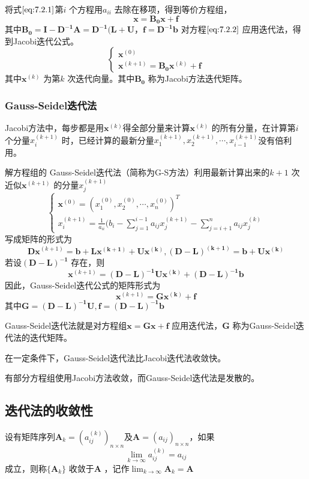 \documentclass[a4paper]{article}
\begin{document}
将式$\ref{eq:7.2.1}$第$i$ 个方程用$a_{ii}$ 去除在移项，得到等价方程组，
\[
\mathbf{x = B_0 x + f} \tag{7.2.2} \label{eq:7.2.2} 
\] 
其中$\mathbf{B_0 = I - D^{-1}A = D^{-1}(L + U}，\mathbf{f = D^{-1} b}$
对方程$\ref{eq:7.2.2}$ 应用迭代法，得到Jacobi迭代公式。
\[
\tag{7.2.3} \label{eq:7.2.3} 
\begin{cases}
	\mathbf{x}^{(0)} \\
	\mathbf{x}^{(k+1)} = \mathbf{B_0} \mathbf{x}^{(k)} + \mathbf{f}
\end{cases} 
\] 
其中$\mathbf{x}^{(k)}$ 为第$k$ 次迭代向量。其中$\mathbf{B_0}$ 称为Jacobi方法迭代矩阵。

\subsubsection{Gauss-Seidel迭代法}
Jacobi方法中，每步都是用$\mathbf{x}^{(k)}$得全部分量来计算$\mathbf{x}^{(k)}$ 的所有分量，在计算第$i$ 个分量$x_i^{(k+1)}$ 时，已经计算的最新分量$x_1^{(k+1)}, x_2^{(k+1)}, \cdots, x_{i-1}^{(k+1)}$没有倍利用。

解方程组的 Gauss-Seidel迭代法（简称为G-S方法）利用最新计算出来的$k+1$ 次近似$\mathbf{x}^{(k+1)}$ 的分量$x_j^{(k+1)}$ 
\[
\tag{7.2.3} \label{eq:7.2.3} 
\begin{cases}
	\mathbf{x}^{(0)} = (x_1^{(0)}, x_2^{(0)},\cdots, x_{n}^{(0)})^{T} \\
	x_{i}^{(k+1)} = \frac{1}{a_{ii}} (b_i - \sum_{j=1}^{i-1} a_{ij} x_j^{(k+1)} - \sum_{j=i+1}^{n} a_{ij} x_j^{(k)}
\end{cases} 
\] 
写成矩阵的形式为
\[
\mathbf{Dx}^{(k+1)} = \mathbf{b + Lx^{(k+1)} + Ux^{(k)}}, \mathbf{(D-L)^{(k+1)} = b + Ux^{(k)}}
\] 
若设$\mathbf{(D-L)^{-1}}$ 存在，则
\[
\mathbf{x}^{(k+1)} = \mathbf{(D-L)^{-1}Ux^{(k)} + (D-L)^{-1}b}
\] 
因此，Gauss-Seidel迭代公式的矩阵形式为
\[
\mathbf{x}^{(k+1)} = \mathbf{Gx^{(k)} + f} \tag{7.2.4} \label{eq:7.2.4} 
\] 
其中$\mathbf{G = (D - L)^{-1}U}, \mathbf{f = (D - L)^{-1}b}$

Gauss-Seidel迭代法就是对方程组$\mathbf{x=Gx + f}$ 应用迭代法，$\mathbf{G}$ 称为Gauss-Seidel迭代法的迭代矩阵。

在一定条件下，Gauss-Seidel迭代法比Jacobi迭代法收敛快。

有部分方程组使用Jacobi方法收敛，而Gauss-Seidel迭代法是发散的。

\subsection{迭代法的收敛性}
\begin{definition}
	设有矩阵序列$\mathbf{A}_k = (a_{ij}^{(k)})_{n \times n}$及$\mathbf{A} = (a_{ij})_{n \times n}$，如果
	\[
		\lim_{k \to \infty} a_{ij}^{(k)} = a_{ij}
	\] 
	成立，则称$\{ \mathbf{A}_k\} $ 收敛于$\mathbf{A}$ ，记作$\lim_{k \to \infty} \mathbf{A}_k = \mathbf{A}$
\end{definition}
\end{document}
